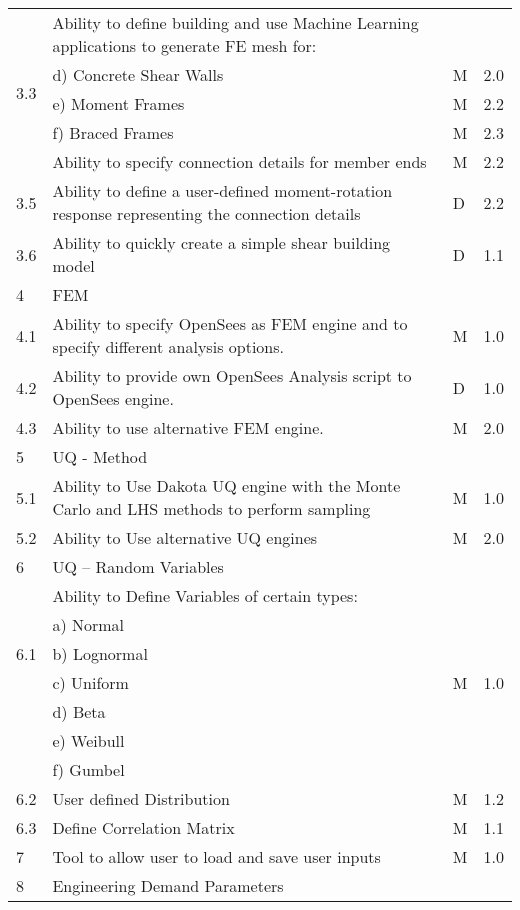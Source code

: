 \begin{table}[hbt!]
\begin{adjustbox}{max width=\textwidth}
\begin{tabular}{llll}
	\multirow{5}{*}{3.3} & Ability to define building and use Machine Learning applications to generate FE mesh for: &  &  \\ 
	 & d)     Concrete Shear Walls & M & 2.0 \\ 
	 & e)     Moment Frames & M & 2.2 \\ 
	 & f)     Braced Frames & M & 2.3  \\ \hline

	3.4 & Ability to specify connection details for member ends & M & 2.2 \\ \hline
	3.5 & Ability to define a user-defined moment-rotation response representing the connection details & D & 2.2 \\ \hline
	3.6 & Ability to quickly create a simple shear building model & D & 1.1 \\ \hline
	4 & FEM &  &  \\ \hline
	4.1 & Ability to specify OpenSees as FEM engine and to specify different analysis options. & M & 1.0 \\ \hline
	4.2 & Ability to provide own OpenSees Analysis script to OpenSees engine. & D & 1.0 \\ \hline
	4.3 & Ability to use alternative FEM engine. & M & 2.0 \\ \hline
	5 & UQ - Method &  &  \\ \hline
	5.1 & Ability to Use Dakota UQ engine with the Monte Carlo and LHS methods to perform sampling & M & 1.0 \\ \hline
	5.2 & Ability to Use alternative UQ engines & M & 2.0 \\ \hline
	6 & UQ – Random Variables &  &  \\ \hline
	\multirow{5}{*}{6.1} & Ability to Define Variables of certain types: &  &  \\ 
	 & a)     Normal &  &  \\ 
	 & b)     Lognormal &  &  \\ 
	 & c)     Uniform & M  & 1.0 \\ 
	 & d)     Beta &  &  \\ 
	 & e)     Weibull &  &  \\ 
	 & f)     Gumbel &  &  \\ \hline
	6.2 & User defined Distribution & M & 1.2 \\ \hline
	6.3 & Define Correlation Matrix & M & 1.1 \\ \hline
	7 & Tool to allow user to load and save user inputs & M & 1.0 \\ \hline
	8 & Engineering Demand Parameters &  &  \\ \hline

\end{tabular}
\end{adjustbox}
\end{table}
